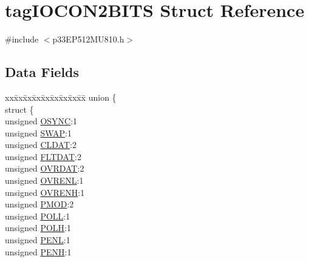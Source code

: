\hypertarget{structtag_i_o_c_o_n2_b_i_t_s}{}\section{tag\+I\+O\+C\+O\+N2\+B\+I\+TS Struct Reference}
\label{structtag_i_o_c_o_n2_b_i_t_s}


{\ttfamily \#include $<$p33\+E\+P512\+M\+U810.\+h$>$}

\subsection*{Data Fields}
\begin{DoxyCompactItemize}
\item 
\begin{tabbing}
xx\=xx\=xx\=xx\=xx\=xx\=xx\=xx\=xx\=\kill
union \{\\
\>struct \{\\
\>\>unsigned \hyperlink{structtag_i_o_c_o_n2_b_i_t_s_aee7f35d5d04fcd5202b9d569e0d08146}{OSYNC}:1\\
\>\>unsigned \hyperlink{structtag_i_o_c_o_n2_b_i_t_s_a3ed0654ceb192d32e26d2929c9b8dcc2}{SWAP}:1\\
\>\>unsigned \hyperlink{structtag_i_o_c_o_n2_b_i_t_s_a5bcbfaa85bc9c3349fb4e269aa308899}{CLDAT}:2\\
\>\>unsigned \hyperlink{structtag_i_o_c_o_n2_b_i_t_s_afcc1e84f8b5860ae56a567b5de96af73}{FLTDAT}:2\\
\>\>unsigned \hyperlink{structtag_i_o_c_o_n2_b_i_t_s_a6d82e38a9acf634763a64a6876f58d3d}{OVRDAT}:2\\
\>\>unsigned \hyperlink{structtag_i_o_c_o_n2_b_i_t_s_a2e98ef1aea75144311343faf9f705f2d}{OVRENL}:1\\
\>\>unsigned \hyperlink{structtag_i_o_c_o_n2_b_i_t_s_a0e87b6433e91b1b0d550e9419e22b408}{OVRENH}:1\\
\>\>unsigned \hyperlink{structtag_i_o_c_o_n2_b_i_t_s_a4a7369a55430f3368fb601d87d479553}{PMOD}:2\\
\>\>unsigned \hyperlink{structtag_i_o_c_o_n2_b_i_t_s_a269dd0694f25a7b4dd065f3570e09b5e}{POLL}:1\\
\>\>unsigned \hyperlink{structtag_i_o_c_o_n2_b_i_t_s_a21a3881dcaa3ce8bccd5d9906aee8e55}{POLH}:1\\
\>\>unsigned \hyperlink{structtag_i_o_c_o_n2_b_i_t_s_af777eadaa0b86bb09cad6117a36e15aa}{PENL}:1\\
\>\>unsigned \hyperlink{structtag_i_o_c_o_n2_b_i_t_s_a91f04ec56f33e5a2e402f3817a44e91d}{PENH}:1\\

\end{tabbing}
\end{DoxyCompactItemize}
